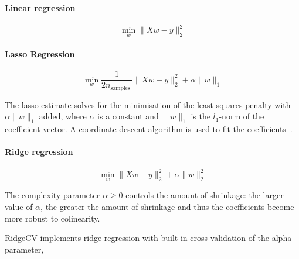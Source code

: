 \paragraph{Linear regression}

\begin{equation}
\min _{w}\|X w-y\|_{2}^{2}
\end{equation}

\paragraph{Lasso Regression}


\begin{equation}
\min _{w} \frac{1}{2 n_{\text {samples }}}\|X w-y\|_{2}^{2}+\alpha\|w\|_{1}
\end{equation}

The lasso estimate solves for the minimisation of the least squares penalty with
$\alpha\|w\|_{1}$ added, where $\alpha$ is a constant and $\|w\|_{1}$ is the
$l_1$-norm of the coefficient vector.
A coordinate descent algorithm is used to fit the coefficients~\cite{scikit-learn}.

\paragraph{Ridge regression}

\begin{equation}
\min _{w}\|X w-y\|_{2}^{2}+\alpha\|w\|_{2}^{2}
\end{equation}

The complexity parameter $\alpha\ge0$ controls the amount of shrinkage:
the larger value of $\alpha$, the greater the amount of shrinkage
and thus the coefficients become more robust to colinearity.

RidgeCV implements ridge regression with built in cross validation of the
alpha parameter,
